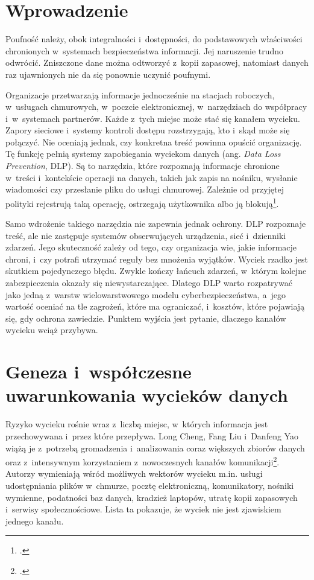 \documentclass[12pt,a4paper]{article}
\begin{document}
\section{Wprowadzenie}

Poufność należy, obok integralności i~dostępności, do podstawowych
właściwości chronionych w~systemach bezpieczeństwa informacji. Jej naruszenie
trudno odwrócić. Zniszczone dane można odtworzyć z~kopii zapasowej, natomiast
danych raz ujawnionych nie da się ponownie uczynić poufnymi.

Organizacje przetwarzają informacje jednocześnie na stacjach roboczych,
w~usługach chmurowych, w~poczcie elektronicznej, w~narzędziach do współpracy
i~w~systemach partnerów. Każde z~tych miejsc może stać się kanałem wycieku.
Zapory sieciowe i~systemy kontroli dostępu rozstrzygają, kto i~skąd może się
połączyć. Nie oceniają jednak, czy konkretna treść powinna opuścić
organizację. Tę funkcję pełnią systemy zapobiegania wyciekom danych (ang.
\emph{Data Loss Prevention}, DLP). Są to narzędzia, które rozpoznają
informacje chronione w~treści i~kontekście operacji na danych, takich jak
zapis na nośniku, wysłanie wiadomości czy przesłanie pliku do usługi
chmurowej. Zależnie od przyjętej polityki rejestrują taką operację,
ostrzegają użytkownika albo ją blokują\footcite{alneyadi2016survey}.

Samo wdrożenie takiego narzędzia nie zapewnia jednak ochrony. DLP rozpoznaje
treść, ale nie zastępuje systemów obserwujących urządzenia, sieć i~dzienniki
zdarzeń. Jego skuteczność zależy od tego, czy organizacja wie, jakie
informacje chroni, i~czy potrafi utrzymać reguły bez mnożenia wyjątków.
Wyciek rzadko jest skutkiem pojedynczego błędu. Zwykle kończy łańcuch
zdarzeń, w~którym kolejne zabezpieczenia okazały się niewystarczające.
Dlatego DLP warto rozpatrywać jako jedną z~warstw wielowarstwowego modelu
cyberbezpieczeństwa, a~jego wartość oceniać na tle zagrożeń, które ma
ograniczać, i~kosztów, które pojawiają się, gdy ochrona zawiedzie. Punktem
wyjścia jest pytanie, dlaczego kanałów wycieku wciąż przybywa.

\section{Geneza i~współczesne uwarunkowania wycieków danych}

Ryzyko wycieku rośnie wraz z~liczbą miejsc, w~których informacja jest
przechowywana i~przez które przepływa. Long Cheng, Fang Liu i~Danfeng Yao
wiążą je z~potrzebą gromadzenia i~analizowania coraz większych zbiorów danych
oraz z~intensywnym korzystaniem z~nowoczesnych kanałów
komunikacji\footcite{cheng2017enterprise}. Autorzy wymieniają wśród możliwych
wektorów wycieku m.in. usługi udostępniania plików w~chmurze, pocztę
elektroniczną, komunikatory, nośniki wymienne, podatności baz danych, kradzież
laptopów, utratę kopii zapasowych i~serwisy społecznościowe. Lista ta
pokazuje, że wyciek nie jest zjawiskiem jednego kanału.
\end{document}

